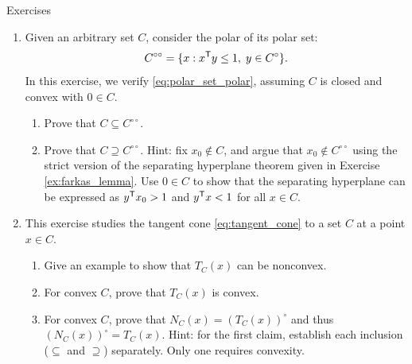 \begin{xcb}{Exercises}
\begin{enumerate}[label=\thechapter.\arabic*]
\item \label{ex:polar_set_polar}
  Given an arbitrary set $C$, consider the polar of its polar set:
  \[
  C^{\circ\circ} = \{ x : x^{\mathsf{T}} y \leq 1, \; y \in C^\circ \}.
  \]
  In this exercise, we verify \eqref{eq:polar_set_polar}, assuming $C$ is closed
  and convex with $0 \in C$.
  
\begin{enumerate}[label=\alph*.] 
\item Prove that $C \subseteq C^{\circ\circ}$.
\item Prove that $C \supseteq C^{\circ\circ}$. Hint: fix $x_0 \notin C$, and
  argue that $x_0 \notin C^{\circ\circ}$ using the strict version of the
  separating hyperplane theorem given in Exercise \ref{ex:farkas_lemma}. Use $0
  \in C$ to show that the separating hyperplane can be expressed as $y^{\mathsf{T}} x_0 >
  1$ and $y^{\mathsf{T}} x < 1$ for all $x \in C$.
\end{enumerate}

\item \label{ex:tangent_cone}
  This exercise studies the tangent cone \eqref{eq:tangent_cone} to a set $C$ at
  a point $x \in C$. 

\begin{enumerate}[label=\alph*.] 
\item Give an example to show that $T_C(x)$ can be nonconvex.
\item For convex $C$, prove that $T_C(x)$ is convex. 
\item For convex $C$, prove that $N_C(x) = (T_C(x))^\circ$ and thus
  $(N_C(x))^\circ = T_C(x)$. Hint: for the first claim, establish each inclusion
  ($\subseteq$ and $\supseteq$) separately. Only one requires convexity.        
\end{enumerate}


\end{enumerate}
\end{xcb}
